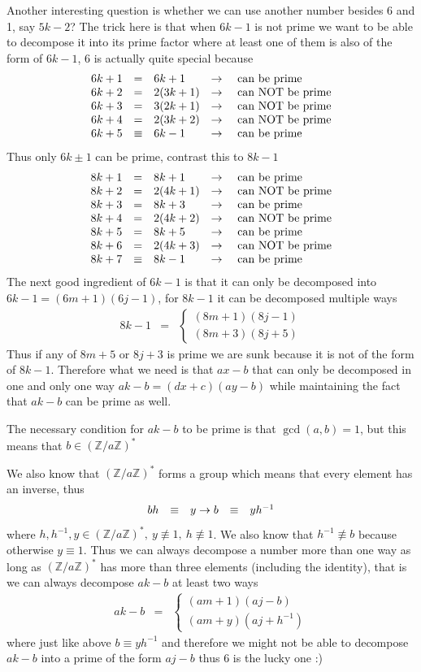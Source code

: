 \documentclass[aps,preprint,preprintnumbers,nofootinbib,showpacs,prd]{revtex4-1}
\newcommand{\ba}{\begin{array}}
\newcommand{\ea}{\end{array}}
\newcommand{\nbea}{\begin{eqnarray*}}
\newcommand{\neea}{\end{eqnarray*}}
\begin{document}
Another interesting question is whether we can use another number besides 6 and 1, say $5k - 2$? The trick here is that when $6k-1$ is not prime we want to be able to decompose it into its prime factor where at least one of them is also of the form of $6k - 1$, 6 is actually quite special because
%
\nbea
\ba{r c l c l}
6k + 1 & = & 6k + 1 & \to & {\rm~can~be~prime} \\
6k + 2 & = & 2(3k + 1) & \to & {\rm~can~NOT~be~prime} \\
6k + 3 & = & 3(2k + 1) & \to & {\rm~can~NOT~be~prime} \\
6k + 4 & = & 2(3k + 2) & \to & {\rm~can~NOT~be~prime} \\
6k + 5 & \equiv & 6k - 1 & \to & {\rm~can~be~prime}
\ea
\neea
%
Thus only $6k \pm 1$ can be prime, contrast this to $8k - 1$
%
\nbea
\ba{r c l c l}
8k + 1 & = & 8k + 1 & \to & {\rm~can~be~prime} \\
8k + 2 & = & 2(4k + 1) & \to & {\rm~can~NOT~be~prime} \\
8k + 3 & = & 8k + 3 & \to & {\rm~can~be~prime} \\
8k + 4 & = & 2(4k + 2) & \to & {\rm~can~NOT~be~prime} \\
8k + 5 & = & 8k + 5 & \to & {\rm~can~be~prime} \\
8k + 6 & = & 2(4k + 3) & \to & {\rm~can~NOT~be~prime} \\
8k + 7 & \equiv & 8k - 1 & \to & {\rm~can~be~prime}
\ea
\neea
%
The next good ingredient of $6k - 1$ is that it can only be decomposed into $6k - 1 = (6m + 1)(6j - 1)$, for $8k - 1$ it can be decomposed multiple ways
%
\nbea
8k - 1 & = & \left \{
\ba{l}
(8m + 1)(8j - 1)\\
(8m + 3)(8j + 5)
\ea
\right.
\neea
%
Thus if any of $8m + 5$ or $8j + 3$ is prime we are sunk because it is not of the form of $8k - 1$. Therefore what we need is that $ax - b$ that can only be decomposed in one and only one way $ak - b = (dx + c)(ay - b)$ while maintaining the fact that $ak - b$ can be prime as well.

The necessary condition for $ak - b$ to be prime is that $\gcd(a,b) = 1$, but this means that $b \in (\mathbb{Z}/a\mathbb{Z})^*$

We also know that $(\mathbb{Z}/a\mathbb{Z})^*$ forms a group which means that every element has an inverse, thus
%
\nbea
\ba{r c l c r c l}
bh & \equiv & y \to b & \equiv & y h^{-1}
\ea
\neea
%
where $h, h^{-1}, y \in (\mathbb{Z}/a\mathbb{Z})^*, ~ y \not\equiv 1, ~ h \not\equiv 1$. We also know that $h^{-1} \not\equiv b$ because otherwise $y \equiv 1$. Thus we can always decompose a number more than one way as long as $(\mathbb{Z}/a\mathbb{Z})^*$ has more than three elements (including the identity), that is we can always decompose $ak - b$ at least two ways
%
\nbea
ak - b & = & \left \{
\ba{l}
(am + 1)(aj - b)\\
(am + y)(aj + h^{-1})
\ea
\right.
\neea
%
where just like above $b \equiv yh^{-1}$ and therefore we might not be able to decompose $ak - b$ into a prime of the form $aj - b$ thus 6 is the lucky one :)
\end{document}
